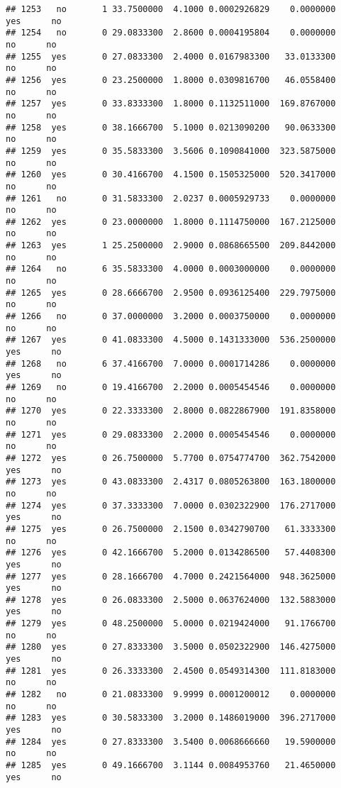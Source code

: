 \documentclass[]{article}
\begin{document}
\begin{verbatim}
## 1253   no       1 33.7500000  4.1000 0.0002926829    0.0000000   yes      no
## 1254   no       0 29.0833300  2.8600 0.0004195804    0.0000000    no      no
## 1255  yes       0 27.0833300  2.4000 0.0167983300   33.0133300    no      no
## 1256  yes       0 23.2500000  1.8000 0.0309816700   46.0558400    no      no
## 1257  yes       0 33.8333300  1.8000 0.1132511000  169.8767000    no      no
## 1258  yes       0 38.1666700  5.1000 0.0213090200   90.0633300    no      no
## 1259  yes       0 35.5833300  3.5606 0.1090841000  323.5875000    no      no
## 1260  yes       0 30.4166700  4.1500 0.1505325000  520.3417000    no      no
## 1261   no       0 31.5833300  2.0237 0.0005929733    0.0000000    no      no
## 1262  yes       0 23.0000000  1.8000 0.1114750000  167.2125000    no      no
## 1263  yes       1 25.2500000  2.9000 0.0868665500  209.8442000    no      no
## 1264   no       6 35.5833300  4.0000 0.0003000000    0.0000000    no      no
## 1265  yes       0 28.6666700  2.9500 0.0936125400  229.7975000    no      no
## 1266   no       0 37.0000000  3.2000 0.0003750000    0.0000000    no      no
## 1267  yes       0 41.0833300  4.5000 0.1431333000  536.2500000   yes      no
## 1268   no       6 37.4166700  7.0000 0.0001714286    0.0000000   yes      no
## 1269   no       0 19.4166700  2.2000 0.0005454546    0.0000000    no      no
## 1270  yes       0 22.3333300  2.8000 0.0822867900  191.8358000    no      no
## 1271  yes       0 29.0833300  2.2000 0.0005454546    0.0000000    no      no
## 1272  yes       0 26.7500000  5.7700 0.0754774700  362.7542000   yes      no
## 1273  yes       0 43.0833300  2.4317 0.0805263800  163.1800000    no      no
## 1274  yes       0 37.3333300  7.0000 0.0302322900  176.2717000   yes      no
## 1275  yes       0 26.7500000  2.1500 0.0342790700   61.3333300    no      no
## 1276  yes       0 42.1666700  5.2000 0.0134286500   57.4408300   yes      no
## 1277  yes       0 28.1666700  4.7000 0.2421564000  948.3625000   yes      no
## 1278  yes       0 26.0833300  2.5000 0.0637624000  132.5883000   yes      no
## 1279  yes       0 48.2500000  5.0000 0.0219424000   91.1766700    no      no
## 1280  yes       0 27.8333300  3.5000 0.0502322900  146.4275000   yes      no
## 1281  yes       0 26.3333300  2.4500 0.0549314300  111.8183000    no      no
## 1282   no       0 21.0833300  9.9999 0.0001200012    0.0000000    no      no
## 1283  yes       0 30.5833300  3.2000 0.1486019000  396.2717000   yes      no
## 1284  yes       0 27.8333300  3.5400 0.0068666660   19.5900000    no      no
## 1285  yes       0 49.1666700  3.1144 0.0084953760   21.4650000   yes      no

\end{verbatim}
\end{document}
